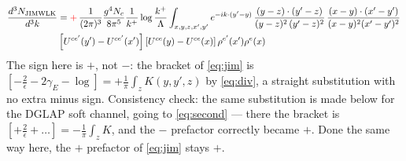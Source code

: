 \documentclass[9pt]{article}
\numberwithin{equation}{section}
\begin{document}
\begin{align}\label{eq:jzform}
    \frac{d^{3}N_{\rm JIMWLK}}{d^{3}k} & = {\color{red}+}\,\frac{1}{(2\pi)^{3}}\frac{g^{4}N_{c}}{8\pi^{5}}\frac{1}{k^{+}}\log\frac{k^{+}}{\Lambda}\int_{x,y,z,x',y'}e^{-ik\cdot(y'-y)}\,\frac{(y-z)\cdot (y'-z)}{(y-z)^{2}\,(y'-z)^{2}}\,\frac{(x-y)\cdot(x'-y')}{(x-y)^{2}(x'-y')^{2}}\,\notag \\ & \left[U^{ce'}(y')-U^{ce'}(x')\right]\left[U^{ce}(y)-U^{ce}(x)\right]\rho^{e'}(x')\rho^{e}(x)
\end{align}
{\color{red}The sign here is $+$, not $-$: the bracket of \eqref{eq:jim} is
$[-\frac{2}{\epsilon}-2\gamma_{E}-\log]=+\frac{1}{\pi}\int_{z}K(y,y',z)$ by \eqref{eq:div}, a
straight substitution with no extra minus sign. Consistency check: the same substitution is
made below for the DGLAP soft channel, going to \eqref{eq:second} --- there the bracket is
$[+\frac{2}{\epsilon}+\dots]=-\frac{1}{\pi}\int_{z}K$, and the $-$ prefactor correctly became
$+$. Done the same way here, the $+$ prefactor of \eqref{eq:jim} stays $+$.}
\end{document}
